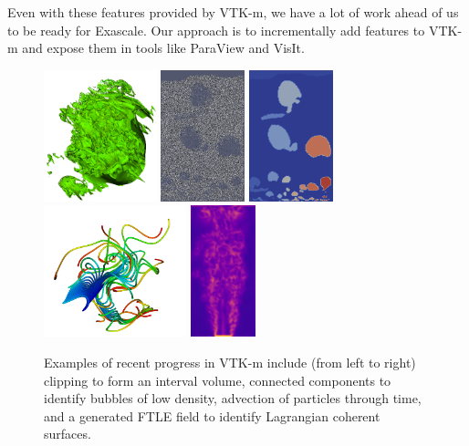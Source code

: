 Even with these features provided by VTK-m, we have a lot of work ahead of us to be ready for Exascale.
Our approach is to incrementally add features to VTK-m and expose them in tools like ParaView and VisIt.


\begin{figure}[t]
  \centering
  \includegraphics[height=1.5in]{projects/2.3.4-DataViz/2.3.4.13-ECP-VTK-m/VTKm-Clip}\quad
  \includegraphics[height=1.5in]{projects/2.3.4-DataViz/2.3.4.13-ECP-VTK-m/VTKm-Bubbles-Density}
  \includegraphics[height=1.5in]{projects/2.3.4-DataViz/2.3.4.13-ECP-VTK-m/VTKm-Bubbles-Components}\quad
  \includegraphics[height=1.5in]{projects/2.3.4-DataViz/2.3.4.13-ECP-VTK-m/VTKm-Streamlines}
  \includegraphics[height=1.5in]{projects/2.3.4-DataViz/2.3.4.13-ECP-VTK-m/VTKm-FTLE}
  \caption{
    Examples of recent progress in VTK-m include (from left to right) clipping to form an interval volume, connected components to identify bubbles of low density, advection of particles through time, and a generated FTLE field to identify Lagrangian coherent surfaces.
  }
  \label{fig:VTKmRecent}
\end{figure}

